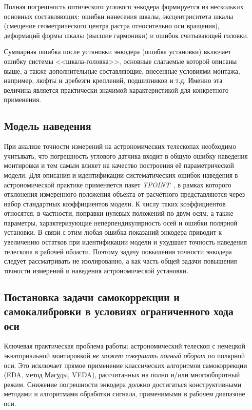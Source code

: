 Полная погрешность оптического углового энкодера формируется из нескольких основных составляющих: ошибки нанесения шкалы, эксцентриситета шкалы (смещение геометрического центра растра относительно оси вращения), деформаций формы шкалы (высшие гармоники) и ошибок считывающей головки. 

Суммарная ошибка после установки энкодера (ошибка установки) включает ошибку системы <<шкала-головка>>, основные слагаемые которой описаны выше, а также дополнительные составляющие, внесенные условиями монтажа, например, люфты и дребезги креплений, подшипников и т.д. Именно эта величина является практически значимой характеристикой для конкретного применения.

\subsection{Модель наведения}

При анализе точности измерений на астрономических телескопах необходимо учитывать, что погрешность углового датчика входит в общую ошибку наведения монтировки и тем самым влияет на качество построения её параметрической модели. Для описания и идентификации систематических ошибок наведения в астрономической практике применяется пакет \textit{TPOINT}~\cite{TPoint_Wallace}, в рамках которого отклонения измеренного положения объекта от расчётного представляются через набор стандартных коэффициентов модели. К числу таких коэффициентов относятся, в частности, поправки нулевых положений по двум осям, а также параметры, характеризующие неперпендикулярность осей и ошибки полярной установки. В связи с этим любая ошибка показаний энкодера приводит к увеличению остатков при идентификации модели и ухудшает точность наведения телескопа в рабочей области. Поэтому задачу повышения точности энкодера следует рассматривать не изолированно, а как часть общей задачи повышения точности измерений и наведения астрономической установки.

\subsection{Постановка задачи самокоррекции и самокалибровки в условиях ограниченного хода оси}

Ключевая практическая проблема работы: астрономический телескоп с немецкой экваториальной монтировкой \emph{не может совершать полный оборот} по полярной оси. Это исключает прямое применение классических алгоритмов самокоррекции (EDA, метод Масуды, VEDA), рассчитанных на полно и/или многооборотный режим. Снижение погрешности энкодера должно достигаться конструктивными методами и алгоритмами обработки сигнала, применимыми в рабочем диапазоне оси.

